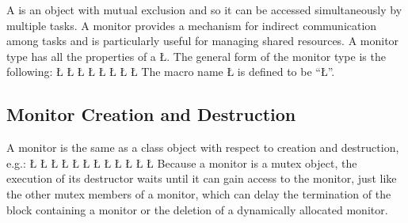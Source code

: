 \documentclass[openright,twoside]{report}
\begin{document}
A  is an object with mutual exclusion and so it can be accessed simultaneously by multiple tasks.
A monitor provides a mechanism for indirect communication among tasks and is particularly useful for managing shared resources.
A monitor type has all the properties of a \LGinlinetrue\LGbegin\lgrinde\L{}\endlgrinde\LGend{}.
The general form of the monitor type is the following:
\LGinlinefalse\LGbegin\lgrinde
\L{}
\L{}
\L{\LB{}}
\CE{}\L{}
\L{\LB{}}
\CE{}\L{}
\L{\LB{}}
\CE{}\L{\LB{\};}}
\endlgrinde\LGend
{}%
The macro name \LGinlinetrue\LGbegin\lgrinde\L{}\endlgrinde\LGend{} is defined to be ``\LGinlinetrue\LGbegin\lgrinde\L{}\endlgrinde\LGend{}''.


\subsection{Monitor Creation and Destruction}

A monitor is the same as a class object with respect to creation and destruction, e.g.:
\LGinlinefalse\LGbegin\lgrinde
\L{}
\L{}
\L{\LB{}}
\CE{}\L{\LB{\};}}
\L{}
\CE{}\L{}
\CE{}\L{\LB{}}
\CE{}\L{\LB{}}
\CE{}\L{\LB{}}
\L{}
\CE{}\L{}
\L{}
\CE{}\endlgrinde\LGend
Because a monitor is a mutex object, the execution of its destructor waits until it can gain access to the monitor, just like the other mutex members of a monitor, which can delay the termination of the block containing a monitor or the deletion of a dynamically allocated monitor.
\end{document}
